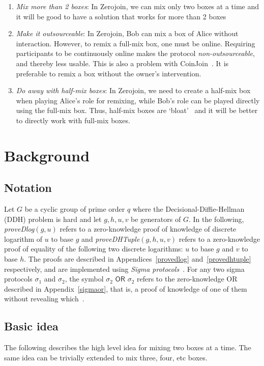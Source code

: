 \documentclass[runningheads]{llncs}
\newcommand{\zerojoin}{Zerojoin\xspace}
\begin{document}
\begin{enumerate}
    \item {\em Mix more than 2 boxes}: In \zerojoin, we can mix only two boxes at a time and it will be good to have a solution that works for more than 2 boxes
    \item {\em Make it outsourceable}: In \zerojoin, Bob can mix a box of Alice without interaction. However, to remix a full-mix box, one must be online. Requiring participants to be continuously online makes the protocol {\em non-outsourceable}, and thereby less usable. This is also a problem with CoinJoin~\cite{coinjoin}. It is preferable to remix a box without the owner's intervention.
    \item {\em Do away with half-mix boxes}: In \zerojoin, we need to create a half-mix box when playing Alice's role for remixing, while Bob's role can be played directly using the full-mix box. Thus, half-mix boxes are `bloat'~\cite{zerojoin} and it will be better to directly work with full-mix boxes.
\end{enumerate}

\section{Background}
\subsection{Notation}

Let $G$ be a cyclic group of prime order $q$ where the Decisional-Diffie-Hellman (DDH) problem is hard and let $g, h, u, v$ be generators of $G$.
In the following, {\em proveDlog$(g, u)$} refers to a zero-knowledge proof of knowledge of discrete logarithm of $u$ to base $g$ and {\em proveDHTuple$(g, h, u, v)$} refers to a zero-knowledge proof of equality of the following two discrete logarithms: $u$ to base $g$ and $v$ to base $h$. The proofs are described in Appendices~\ref{provedlog} and~\ref{provedhtuple} respectively, and are implemented using {\em Sigma protocols}~\cite{zerojoin,CDS94}.
For any two sigma protocols $\sigma_1$ and $\sigma_2$, the symbol $\sigma_2 \textsf{ OR } \sigma_2$ refers to the zero-knowledge OR described in Appendix~\ref{sigmaor}, that is, a proof of knowledge of one of them without revealing which~\cite{CDS94}.

\subsection{Basic idea}
The following describes the high level idea for mixing two boxes at a time. The same idea can be trivially extended to mix three, four, etc boxes.
\end{document}
